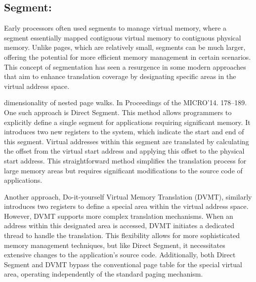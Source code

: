 \subsection{Segment:}
Early processors often used segments to manage virtual memory, where a segment essentially mapped contiguous 
virtual memory to contiguous physical memory. Unlike pages, which are relatively small, segments can be much 
larger, offering the potential for more efficient memory management in certain scenarios. 
This concept of segmentation has seen a resurgence in some modern approaches that aim to enhance 
translation coverage by designating specific areas in the virtual address space.
\newline

dimensionality of nested page walks. In Proceedings of the MICRO’14. 178–189.
One such approach is Direct Segment. This method allows programmers to explicitly define 
a single segment for applications requiring significant memory. It introduces two new 
registers to the system, which indicate the start and end of this segment. 
Virtual addresses within this segment are translated by calculating 
the offset from the virtual start address and applying this offset to the 
physical start address. This straightforward method simplifies the translation 
process for large memory areas but requires significant modifications to the 
source code of applications.
\newline

Another approach, Do-it-yourself Virtual Memory Translation (DVMT), similarly 
introduces two registers to define a special area within the virtual address space. 
However, DVMT supports more complex translation mechanisms. When an address 
within this designated area is accessed, DVMT initiates a dedicated 
thread to handle the translation. This flexibility allows for more 
sophisticated memory management techniques, but like Direct Segment, 
it necessitates extensive changes to the application's source code. 
Additionally, both Direct Segment and DVMT bypass the conventional page table 
for the special virtual area, operating independently of the standard 
paging mechanism.
\newline

